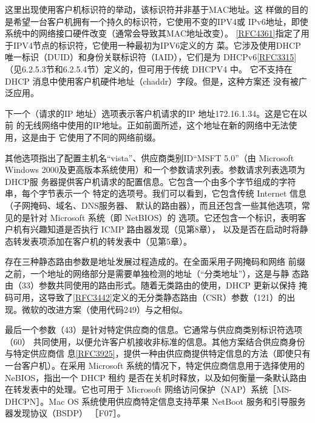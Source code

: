 \begin{tcolorbox}
    这里出现使用客户机标识符的举动，该标识符并非基于MAC地址。这
    样做的目的是希望一台客户机拥有一个持久的标识符，它使用不变的IPV4或
    IPv6地址，即使系统中的网络接口硬件改变（通常会导致其MAC地址改变）。
    \href{https://www.rfc-editor.org/rfc/rfc4361}{\href{https://www.rfc-editor.org/rfc/rfc4361}{[RFC4361]}}指定了用于IPV4节点的标识符，它使用一种最初为IPV6定义的方
    菜。它涉及使用DHCP 唯一标识（DUID）和身份关联标识符（IAID），它们是为
    DHCPv6\href{https://www.rfc-editor.org/rfc/rfc3315}{\href{https://www.rfc-editor.org/rfc/rfc3315}{[RFC3315]}}（见6.2.5.3节和6.2.5.4节）定义的，但可用于传统 DHCPV4 中。
    它不支持在 DHCP 消息中使用客户机硬件地址（chaddr）字段。但是，这种方案还
    没有被广泛应用。
\end{tcolorbox}

下一个（请求的IP 地址）选项表示客户机请求的IP 地址172.16.1.34。这是它在以前
的无线网络中使用的IP地址。正如前面所述，这个地址在新的网络中无法使用，这是由于
它使用了不同的网络前缀。

其他选项指出了配置主机名“vista”、供应商类别ID“MSFT 5.0”（由 Microsoft
Windows 2000及更高版本系统使用）和一个参数请求列表。参数请求列表选项为DHCP服
务器提供客户机请求的配置信息。它包含一个由多个字节组成的字符串，每个字节表示一个
特定的选项号。我们可以看到，它包含传统 Internet 信息（子网掩码、域名、DNS服务器、
默认的路由器），而且还包含一些其他选项，常见的是针对 Microsoft 系统（即 NetBIOS）的
选项。它还包含一个标识，表明客户机有兴趣知道是否执行 ICMP 路由器发现（见第8章），
以及是否在启动时将静态转发表项添加在客户机的转发表中（见第5章）。

\begin{tcolorbox}
    存在三种静态路由参数是地址发展过程造成的。在全面采用子网掩码和网络
    前缀之前，一个地址的网络部分是需要单独检测的地址（“分类地址”），这是与静
    态路由（33）参数共同使用的路由形式。随着无类路由的使用，DHCP 更新以保持
    掩码可用，这导致了\href{https://www.rfc-editor.org/rfc/rfc3442}{\href{https://www.rfc-editor.org/rfc/rfc3442}{[RFC3442]}}定义的无分类静态路由（CSR）参数（121）的出
    现。微软的改进方案（使用代码249）与之相似。
\end{tcolorbox}

最后一个参数（43）是针对特定供应商的信息。它通常与供应商类别标识符选项（60）
共同使用，以便允许客户机接收非标准的信息。其他方案结合供应商身份与特定供应商信
息\href{https://www.rfc-editor.org/rfc/rfc3925}{\href{https://www.rfc-editor.org/rfc/rfc3925}{[RFC3925]}}，提供一种由供应商提供特定信息的方法（即使只有一台客户机）。在采用
Microsoft 系统的情况下，特定供应商信息用于选择使用的 NeBIOS，指出一个 DHCP 租约
是否在关机时释放，以及如何衡量一条默认路由在转发表中的处理。它也可用于 Microsoft
网络访问保护（NAP）系统［MS-DHCPN］。Mac OS 系统使用供应商特定信息支持苹果
NetBoot 服务和引导服务器发现协议（BSDP） ［F07］。

